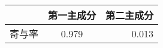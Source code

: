 \begin{table}[htb]
  \begin{center}
    \begin{tabular}{|l||c|r|} \hline
       & 第一主成分 & 第二主成分 \\ \hline
      寄与率 & 0.979 & 0.013 \\ \hline
    \end{tabular}
  \end{center}
\end{table}
